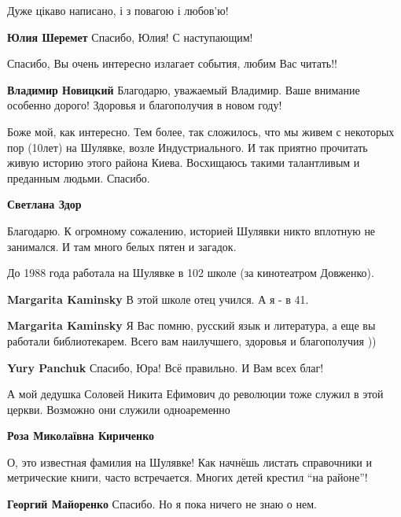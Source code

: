\begin{itemize}
Дуже цікаво написано, і з повагою і любов'ю!

\textbf{Юлия Шеремет} Спасибо, Юлия! С наступающим!

Спасибо, Вы очень интересно излагает события, любим Вас читать!!

\textbf{Владимир Новицкий} Благодарю, уважаемый Владимир. Ваше внимание особенно дорого! Здоровья и благополучия в новом году!


Боже мой, как интересно. Тем более, так сложилось, что мы живем с некоторых
пор (10лет) на Шулявке, возле Индустриального. И так приятно прочитать живую
историю этого района Киева. Восхищаюсь такими талантливым и преданным людьми.
Спасибо.

\textbf{Светлана Здор} 

Благодарю. К огромному сожалению, историей Шулявки никто вплотную не занимался.
И там много белых пятен и загадок.



До 1988 года работала на Шулявке в 102 школе (за кинотеатром Довженко).

\begin{itemize} %
\textbf{Margarita Kaminsky} В этой школе отец учился. А я - в 41.

\textbf{Margarita Kaminsky} Я Вас помню, русский язык и литература, а еще вы работали библиотекарем. Всего вам наилучшего, здоровья и благополучия ))

\textbf{Yury Panchuk}
Спасибо, Юра! Всё правильно. И Вам всех благ!
\end{itemize} %


А мой дедушка Соловей Никита Ефимович до революции тоже служил в этой церкви.
Возможно они служили одноаременно

\begin{itemize} %
\textbf{Роза Миколаївна Кириченко} 

О, это известная фамилия на Шулявке! Как начнёшь листать справочники и
метрические книги, часто встречается. Многих детей крестил \enquote{на районе}!

\textbf{Георгий Майоренко} Спасибо. Но я пока ничего не знаю о нем.


\end{itemize}
\end{itemize}
